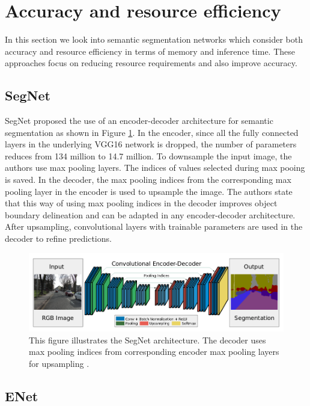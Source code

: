 \section{Accuracy and resource efficiency}
\label{section:acceff}

In this section we look into semantic segmentation networks which consider both accuracy and resource efficiency in terms of memory and inference time. These approaches focus on reducing resource requirements and also improve accuracy.

\subsection{SegNet}

SegNet \cite{DBLP:journals/corr/BadrinarayananK15} proposed the use of an encoder-decoder architecture for semantic segmentation as shown in Figure \ref{Fig:segnet}. In the encoder, since all the fully connected layers in the underlying VGG16 network is dropped, the number of parameters reduces from 134 million to 14.7 million. To downsample the input image, the authors use max pooling layers. The indices of values selected during max pooing is saved. In the decoder, the max pooling indices from the corresponding max pooling layer in the encoder is used to upsample the image. The authors state that this way of using max pooling indices in the decoder improves object boundary delineation and can be adapted in any encoder-decoder architecture. After upsampling, convolutional layers with trainable parameters are used in the decoder to refine predictions. 

	\begin{figure}
		\centering
		\includegraphics[width=1\linewidth]{images/segnet}
		\caption{This figure illustrates the SegNet architecture. The decoder uses max pooling indices from corresponding encoder max pooling layers for upsampling \cite{DBLP:journals/corr/BadrinarayananK15}.}
		\label{Fig:segnet}
	\end{figure}

\subsection{ENet}

